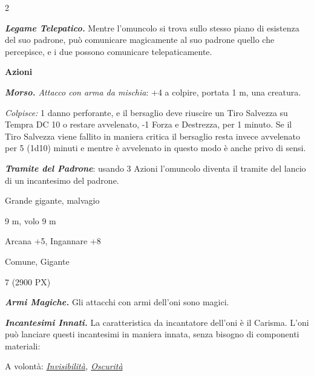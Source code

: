 \begin{multicols}{2}
{\emph{\textbf{Legame Telepatico.}} Mentre l'omuncolo si trova sullo stesso piano di esistenza del suo padrone, può comunicare magicamente al suo padrone quello che percepisce, e i due possono comunicare telepaticamente.

\textbf{Azioni}

\emph{\textbf{Morso.} Attacco con arma da mischia}: +4 a colpire, portata 1 m, una creatura.

\emph{Colpisce:} 1 danno perforante, e il bersaglio deve riuscire un Tiro Salvezza su Tempra DC 10 o restare avvelenato, -1 Forza e Destrezza, per 1 minuto. Se il Tiro Salvezza viene fallito in maniera critica il bersaglio resta invece avvelenato per 5 (1d10) minuti e mentre è avvelenato in questo modo è anche privo di sensi.

\emph{\textbf{Tramite del Padrone}}: usando 3 Azioni l'omuncolo diventa il tramite del lancio di un incantesimo del padrone.

\begin{description}[noitemsep, topsep=0pt, parsep=0pt, partopsep=0pt, itemsep=1pt, leftmargin=2.35cm,  labelwidth=2.2cm, itemindent=0cm, listparindent=0pt] %
\setlength{\baselineskip}{10pt}
\item[\textbf{Taglia/Tipo}] Grande gigante, malvagio
\item[\textbf{Caratt.}] 
\item[\textbf{Punti Ferita}] 
\item[\textbf{Movimento}] 9 m, volo 9 m
\item[\textbf{Tiri Salvez.}] 
\item[\textbf{Comp.}] Arcana +5, Ingannare +8
\item[\textbf{Sensi}] 
\item[\textbf{Linguaggi}] Comune, Gigante
\item[\textbf{Sfida}] 7 (2900 PX)
\end{description}
\smallskip

\emph{\textbf{Armi Magiche.}} Gli attacchi con armi dell'oni sono magici.

\emph{\textbf{Incantesimi Innati.}} La caratteristica da incantatore dell'oni è il Carisma. L'oni può lanciare questi incantesimi in maniera innata, senza bisogno di componenti materiali:

A volontà: \emph{\hyperlink{Invisibilità}{Invisibilità}, \hyperlink{Oscurità}{Oscurità}}

}
\end{multicols}
